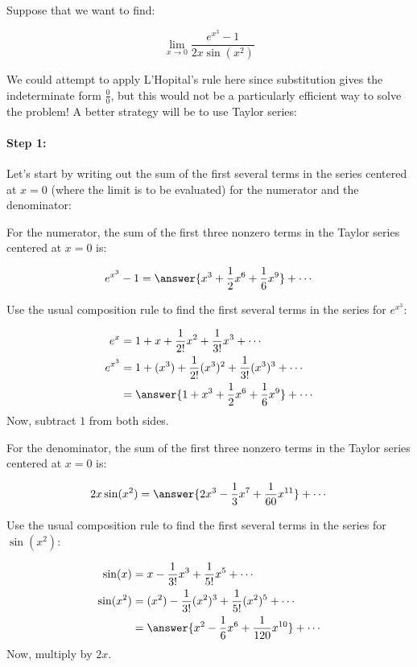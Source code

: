 \documentclass{ximera}
\author{Jim Talamo}
\begin{document}
\begin{exercise}
Suppose that we want to find:

\[
\lim_{x \to 0} \frac{e^{x^3}-1}{2x \sin(x^2)}
\]


We could attempt to apply L'Hopital's rule here since substitution gives the indeterminate form $\frac{0}{0}$, but this would not be a particularly efficient way to solve the problem!  A better strategy will be to use Taylor series:


\paragraph{Step 1:} Let's start by writing out the sum of the first several terms in the series centered at $x=0$ (where the limit is to be evaluated) for the numerator and the denominator:

\begin{exercise}
For the numerator, the sum of the first three nonzero terms in the Taylor series centered at $x=0$ is:

\[
e^{x^3}-1 = \answer{x^3+\frac{1}{2}x^6+\frac{1}{6}x^9} +\cdots
\]

\begin{hint}
Use the usual composition rule to find the first several terms in the series for $e^{x^3}$:

\begin{align*}
e^x &= 1+x+\frac{1}{2!}x^2+\frac{1}{3!}x^3+\cdots \\
e^{x^3} &= 1+(x^3)+\frac{1}{2!}(x^3)^2+\frac{1}{3!}(x^3)^3+\cdots \\
&= \answer{1+x^3+\frac{1}{2}x^6+\frac{1}{6}x^9}+\cdots \\
\end{align*}
Now, subtract $1$ from both sides.
\end{hint}
\end{exercise}


\begin{exercise}
For the denominator, the sum of the first three nonzero terms in the Taylor series centered at $x=0$ is:

\[
2x \sin(x^2) = \answer{2x^3-\frac{1}{3}x^7+\frac{1}{60}x^{11}} +\cdots
\]

\begin{hint}
Use the usual composition rule to find the first several terms in the series for $\sin(x^2)$:

\begin{align*}
\sin(x) &= x-\frac{1}{3!}x^3+\frac{1}{5!}x^5+\cdots \\
\sin(x^2) &= (x^2)-\frac{1}{3!}(x^2)^3+\frac{1}{5!}(x^2)^5+\cdots \\
&= \answer{x^2-\frac{1}{6}x^6+\frac{1}{120}x^{10}}+\cdots \\
\end{align*}
Now, multiply by $2x$.
\end{hint}
\end{exercise}



\end{exercise}
\end{document}
